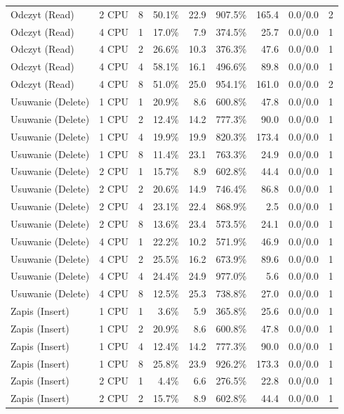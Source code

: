 \begin{table}[ht]
{\begin{tabular}{llcrrrrcc}
Odczyt (Read) & 2 CPU & 8 & 50.1\% & 22.9 & 907.5\% & 165.4 & 0.0/0.0 & 2 \\
Odczyt (Read) & 4 CPU & 1 & 17.0\% & 7.9 & 374.5\% & 25.7 & 0.0/0.0 & 1 \\
Odczyt (Read) & 4 CPU & 2 & 26.6\% & 10.3 & 376.3\% & 47.6 & 0.0/0.0 & 1 \\
Odczyt (Read) & 4 CPU & 4 & 58.1\% & 16.1 & 496.6\% & 89.8 & 0.0/0.0 & 1 \\
Odczyt (Read) & 4 CPU & 8 & 51.0\% & 25.0 & 954.1\% & 161.0 & 0.0/0.0 & 2 \\
Usuwanie (Delete) & 1 CPU & 1 & 20.9\% & 8.6 & 600.8\% & 47.8 & 0.0/0.0 & 1 \\
Usuwanie (Delete) & 1 CPU & 2 & 12.4\% & 14.2 & 777.3\% & 90.0 & 0.0/0.0 & 1 \\
Usuwanie (Delete) & 1 CPU & 4 & 19.9\% & 19.9 & 820.3\% & 173.4 & 0.0/0.0 & 1 \\
Usuwanie (Delete) & 1 CPU & 8 & 11.4\% & 23.1 & 763.3\% & 24.9 & 0.0/0.0 & 1 \\
Usuwanie (Delete) & 2 CPU & 1 & 15.7\% & 8.9 & 602.8\% & 44.4 & 0.0/0.0 & 1 \\
Usuwanie (Delete) & 2 CPU & 2 & 20.6\% & 14.9 & 746.4\% & 86.8 & 0.0/0.0 & 1 \\
Usuwanie (Delete) & 2 CPU & 4 & 23.1\% & 22.4 & 868.9\% & 2.5 & 0.0/0.0 & 1 \\
Usuwanie (Delete) & 2 CPU & 8 & 13.6\% & 23.4 & 573.5\% & 24.1 & 0.0/0.0 & 1 \\
Usuwanie (Delete) & 4 CPU & 1 & 22.2\% & 10.2 & 571.9\% & 46.9 & 0.0/0.0 & 1 \\
Usuwanie (Delete) & 4 CPU & 2 & 25.5\% & 16.2 & 673.9\% & 89.6 & 0.0/0.0 & 1 \\
Usuwanie (Delete) & 4 CPU & 4 & 24.4\% & 24.9 & 977.0\% & 5.6 & 0.0/0.0 & 1 \\
Usuwanie (Delete) & 4 CPU & 8 & 12.5\% & 25.3 & 738.8\% & 27.0 & 0.0/0.0 & 1 \\
Zapis (Insert) & 1 CPU & 1 & 3.6\% & 5.9 & 365.8\% & 25.6 & 0.0/0.0 & 1 \\
Zapis (Insert) & 1 CPU & 2 & 20.9\% & 8.6 & 600.8\% & 47.8 & 0.0/0.0 & 1 \\
Zapis (Insert) & 1 CPU & 4 & 12.4\% & 14.2 & 777.3\% & 90.0 & 0.0/0.0 & 1 \\
Zapis (Insert) & 1 CPU & 8 & 25.8\% & 23.9 & 926.2\% & 173.3 & 0.0/0.0 & 1 \\
Zapis (Insert) & 2 CPU & 1 & 4.4\% & 6.6 & 276.5\% & 22.8 & 0.0/0.0 & 1 \\
Zapis (Insert) & 2 CPU & 2 & 15.7\% & 8.9 & 602.8\% & 44.4 & 0.0/0.0 & 1 \\

\end{tabular}}
\end{table}
